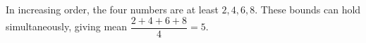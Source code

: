 In increasing order, the four numbers are at least $2,4,6,8$. These bounds can hold simultaneously, giving mean $\dfrac{2+4+6+8}{4}=\boxed5$.

